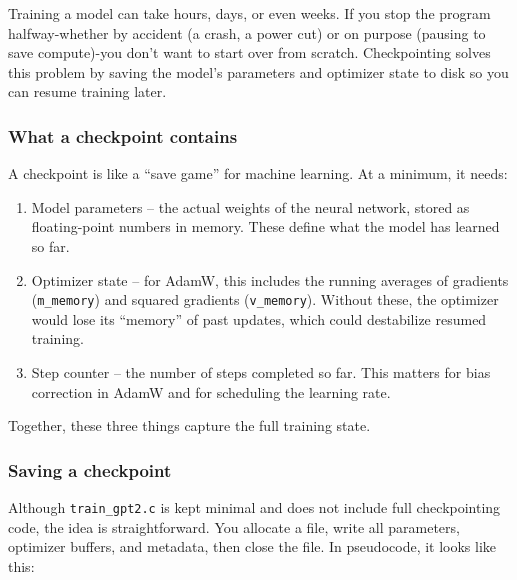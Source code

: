 \documentclass[
  letterpaper,
  DIV=11,
  numbers=noendperiod]{scrreprt}
\providecommand{\tightlist}{%
  \setlength{\itemsep}{0pt}\setlength{\parskip}{0pt}}
\begin{document}
Training a model can take hours, days, or even weeks. If you stop the
program halfway-whether by accident (a crash, a power cut) or on purpose
(pausing to save compute)-you don't want to start over from scratch.
Checkpointing solves this problem by saving the model's parameters and
optimizer state to disk so you can resume training later.

\subsubsection{What a checkpoint
contains}\label{what-a-checkpoint-contains}

A checkpoint is like a ``save game'' for machine learning. At a minimum,
it needs:

\begin{enumerate}
\def\labelenumi{\arabic{enumi}.}
\tightlist
\item
  Model parameters -- the actual weights of the neural network, stored
  as floating-point numbers in memory. These define what the model has
  learned so far.
\item
  Optimizer state -- for AdamW, this includes the running averages of
  gradients (\texttt{m\_memory}) and squared gradients
  (\texttt{v\_memory}). Without these, the optimizer would lose its
  ``memory'' of past updates, which could destabilize resumed training.
\item
  Step counter -- the number of steps completed so far. This matters for
  bias correction in AdamW and for scheduling the learning rate.
\end{enumerate}

Together, these three things capture the full training state.

\subsubsection{Saving a checkpoint}\label{saving-a-checkpoint}

Although \texttt{train\_gpt2.c} is kept minimal and does not include
full checkpointing code, the idea is straightforward. You allocate a
file, write all parameters, optimizer buffers, and metadata, then close
the file. In pseudocode, it looks like this:
\end{document}
